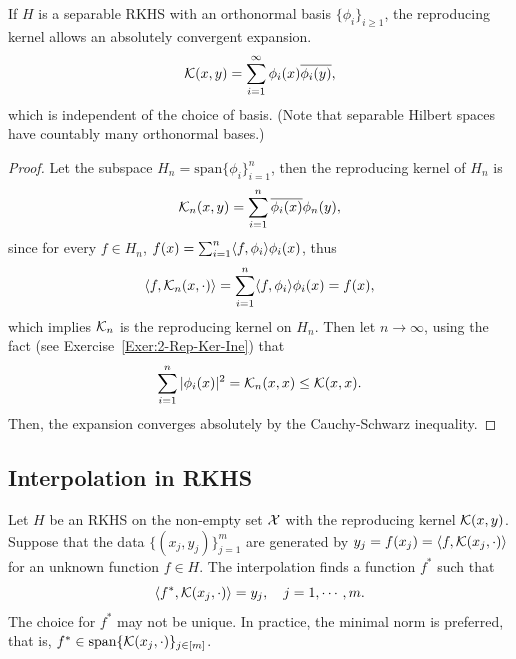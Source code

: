 \begin{theorem}
    If $H$ is a separable RKHS with an orthonormal basis $\{\phi_i\}_{i\ge 1}$, the reproducing kernel allows an absolutely convergent expansion.
    \begin{equation}
        \mathcal K(x, y) = \sum_{i=1}^{\infty} \phi_i(x) \overline{\phi_i(y)}, 
    \end{equation}
    which is independent of the choice of basis. (Note that separable Hilbert spaces have countably many orthonormal bases.)
\end{theorem}
\begin{proof}
     Let the subspace $H_n = \textrm{span}\{\phi_i\}_{i=1}^n$, then the reproducing kernel of $H_n$ is 
     \begin{equation*}
         \mathcal K_n(x, y) = \sum_{i=1}^n \overline{\phi_i(x)} {\phi_n(y)},
     \end{equation*}
     since for every $f\in H_n$, $f(x) = \sum_{i=1}^n \langle {f, \phi_i} \rangle \phi_i(x)$, thus 
     \begin{equation*}
         \langle {f, \mathcal K_n(x, \cdot)} \rangle = \sum_{i=1}^n \langle {f, \phi_i} \rangle \phi_i(x) = f(x),
     \end{equation*}
     which implies $\mathcal K_n$ is the reproducing kernel on $H_n$. Then let $n\to\infty$, using the fact (see Exercise~\ref{Exer:2-Rep-Ker-Ine}) that 
     \begin{equation}
         \sum_{i=1}^{n} |\phi_i(x)|^2 = \mathcal K_n(x, x) \le \mathcal K(x, x).
     \end{equation}
     Then, the expansion converges absolutely by the Cauchy-Schwarz inequality.
\end{proof}
\subsection{Interpolation in RKHS}
\label{SSec: 2-Int-RKH}
Let $H$ be an RKHS on the non-empty set $\mathcal X$ with the reproducing kernel $\mathcal K(x, y)$. Suppose that the data $\{(x_j, y_j)\}_{j=1}^m$ are generated by $  y_j = f(x_j) = \langle {f, \mathcal K(x_j,\cdot)} \rangle $ for an unknown function $f\in H$. The interpolation finds a function $f^{\ast}$ such that 
\begin{equation}
    \langle {f^{\ast}, \mathcal K(x_j,\cdot)} \rangle = y_j,\quad j=1,\cdots, m.
\end{equation}
The choice for $f^{\ast}$ may not be unique. In practice, the minimal norm is preferred, that is, $f^{\ast}\in \textrm{span}\{ \mathcal K(x_j,\cdot)\}_{j\in[m]}$.   

